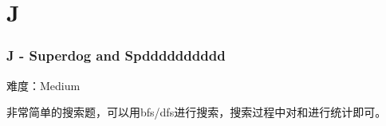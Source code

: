 \section{J}
\begin{frame}
\frametitle{J - Superdog and Spdddddddddd}
难度：Medium

非常简单的搜索题，可以用bfs/dfs进行搜索，搜索过程中对和进行统计即可。
\end{frame}